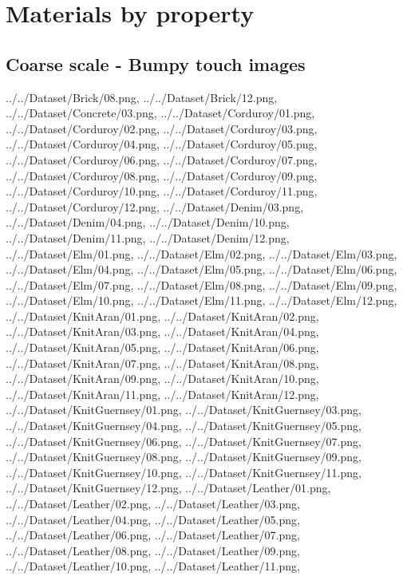 
\section{Materials by property} \label{sec:materialsbyproperty}

\subsection{Coarse scale - Bumpy touch images}
{../../Dataset/Brick/08.png,
../../Dataset/Brick/12.png,
../../Dataset/Concrete/03.png,
../../Dataset/Corduroy/01.png,
../../Dataset/Corduroy/02.png,
../../Dataset/Corduroy/03.png,
../../Dataset/Corduroy/04.png,
../../Dataset/Corduroy/05.png,
../../Dataset/Corduroy/06.png,
../../Dataset/Corduroy/07.png,
../../Dataset/Corduroy/08.png,
../../Dataset/Corduroy/09.png,
../../Dataset/Corduroy/10.png,
../../Dataset/Corduroy/11.png,
../../Dataset/Corduroy/12.png,
../../Dataset/Denim/03.png,
../../Dataset/Denim/04.png,
../../Dataset/Denim/10.png,
../../Dataset/Denim/11.png,
../../Dataset/Denim/12.png,
../../Dataset/Elm/01.png,
../../Dataset/Elm/02.png,
../../Dataset/Elm/03.png,
../../Dataset/Elm/04.png,
../../Dataset/Elm/05.png,
../../Dataset/Elm/06.png,
../../Dataset/Elm/07.png,
../../Dataset/Elm/08.png,
../../Dataset/Elm/09.png,
../../Dataset/Elm/10.png,
../../Dataset/Elm/11.png,
../../Dataset/Elm/12.png,
../../Dataset/KnitAran/01.png,
../../Dataset/KnitAran/02.png,
../../Dataset/KnitAran/03.png,
../../Dataset/KnitAran/04.png,
../../Dataset/KnitAran/05.png,
../../Dataset/KnitAran/06.png,
../../Dataset/KnitAran/07.png,
../../Dataset/KnitAran/08.png,
../../Dataset/KnitAran/09.png,
../../Dataset/KnitAran/10.png,
../../Dataset/KnitAran/11.png,
../../Dataset/KnitAran/12.png,
../../Dataset/KnitGuernsey/01.png,
../../Dataset/KnitGuernsey/03.png,
../../Dataset/KnitGuernsey/04.png,
../../Dataset/KnitGuernsey/05.png,
../../Dataset/KnitGuernsey/06.png,
../../Dataset/KnitGuernsey/07.png,
../../Dataset/KnitGuernsey/08.png,
../../Dataset/KnitGuernsey/09.png,
../../Dataset/KnitGuernsey/10.png,
../../Dataset/KnitGuernsey/11.png,
../../Dataset/KnitGuernsey/12.png,
../../Dataset/Leather/01.png,
../../Dataset/Leather/02.png,
../../Dataset/Leather/03.png,
../../Dataset/Leather/04.png,
../../Dataset/Leather/05.png,
../../Dataset/Leather/06.png,
../../Dataset/Leather/07.png,
../../Dataset/Leather/08.png,
../../Dataset/Leather/09.png,
../../Dataset/Leather/10.png,
../../Dataset/Leather/11.png,
}
